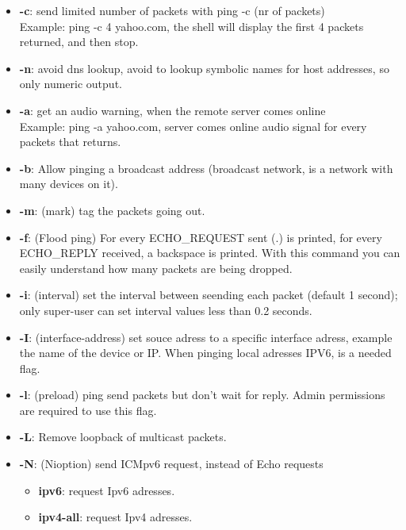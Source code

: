 \documentclass[hidelinks,12pt,a4paper,numbers=enddot]{scrartcl}
\begin{document}
\begin{itemize}
    \item \textbf{-c}: send limited number of packets with ping -c (nr of packets)\\
        Example: ping -c 4 yahoo.com, the shell will display the first 4 packets returned,
        and then stop.
    
    \item \textbf{-n}: avoid dns lookup, avoid to lookup symbolic names for host addresses,
        so only numeric output.
    
    \item \textbf{-a}: get an audio warning, when the remote server comes online \\
        Example: ping -a yahoo.com, server comes online audio signal for every
        packets that returns.
    
    \item \textbf{-b}: Allow pinging a broadcast address (broadcast network, is a network
        with many devices on it).
    
    \item \textbf{-m}: (mark) tag the packets going out.
    \item \textbf{-f}: (Flood ping) For every ECHO\_REQUEST sent (.) is printed,
        for every ECHO\_REPLY received, a backspace is printed.
        With this command you can easily understand how many packets are being dropped.
    
    \item \textbf{-i}: (interval) set the interval between seending each packet (default 1 second);
        only super-user can set interval values less than 0.2 seconds.
    
    \item \textbf{-I}: (interface-address) set souce adress to a specific interface adress,
        example the name of the device or IP. When pinging local adresses IPV6, is a needed flag.
    
    \item \textbf{-l}: (preload) ping send packets but don't wait for reply.
        Admin permissions are required to use this flag.
    
    \item \textbf{-L}: Remove loopback of multicast packets.
    \item \textbf{-N}: (Nioption) send ICMpv6 request, instead of Echo requests
        \begin{itemize}
            \item \textbf{ipv6}: request Ipv6 adresses.
            \item \textbf{ipv4-all}: request Ipv4 adresses.
        \end{itemize}
    

\end{itemize}
\end{document}
